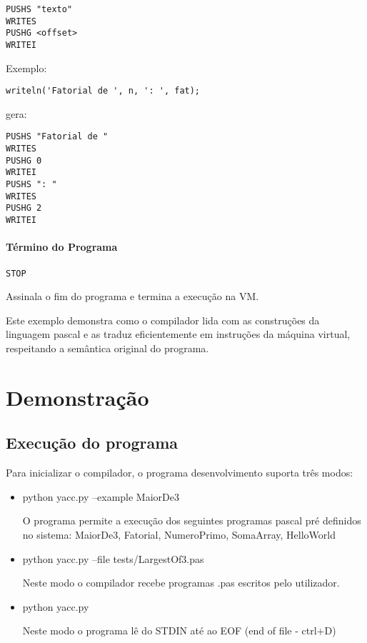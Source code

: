 \documentclass[12pt,a4paper]{report}%
\begin{document}
\begin{verbatim}
PUSHS "texto"
WRITES
PUSHG <offset>
WRITEI
\end{verbatim}

Exemplo:
\begin{verbatim}
writeln('Fatorial de ', n, ': ', fat);
\end{verbatim}
gera:
\begin{verbatim}
PUSHS "Fatorial de "
WRITES
PUSHG 0
WRITEI
PUSHS ": "
WRITES
PUSHG 2
WRITEI
\end{verbatim}

\subsubsection{Término do Programa}

\begin{verbatim}
STOP
\end{verbatim}

Assinala o fim do programa e termina a execução na VM.

Este exemplo demonstra como o compilador lida com as construções da linguagem pascal e as traduz eficientemente em instruções da máquina virtual, respeitando a semântica original do programa.

\chapter{Demonstração}

\section{Execução do programa}

Para inicializar o compilador, o programa desenvolvimento suporta três modos:
\begin{itemize}
    \item python yacc.py --example MaiorDe3
    
        O programa permite a execução dos seguintes programas pascal pré definidos no sistema: MaiorDe3, Fatorial, NumeroPrimo, SomaArray, HelloWorld

    \item python yacc.py --file tests/LargestOf3.pas

        Neste modo o compilador recebe programas .pas escritos pelo utilizador.

    \item python yacc.py

        Neste modo o programa lê do STDIN até ao EOF (end of file - ctrl+D)
    
\end{itemize}
\end{document}
